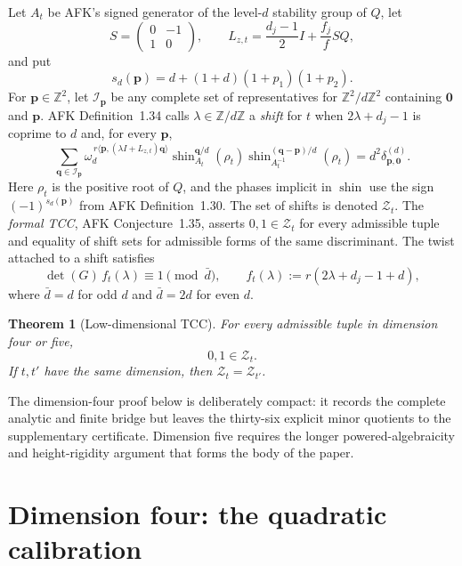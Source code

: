 \documentclass[11pt]{article}
\newtheorem{theorem}{Theorem}
\newcommand{\Z}{\mathbb Z}
\begin{document}
Let $A_t$ be AFK's signed generator of the level-$d$ stability group
of $Q$, let
\[
 S=\begin{pmatrix}0&-1\\1&0\end{pmatrix},\qquad
 L_{z,t}=\frac{d_j-1}{2}I+\frac{f_j}{f}SQ,
\]
and put
\[
 s_d(\boldsymbol p)
 =d+(1+d)(1+p_1)(1+p_2).
\]
For $\boldsymbol p\in\Z^2$, let
$\mathcal I_{\boldsymbol p}$ be any complete set of representatives
for $\Z^2/d\Z^2$ containing $\boldsymbol0$ and $\boldsymbol p$.
AFK Definition~1.34 calls $\lambda\in\Z/d\Z$ a \emph{shift} for $t$
when $2\lambda+d_j-1$ is coprime to $d$ and, for every
$\boldsymbol p$,
\[
 \sum_{\boldsymbol q\in\mathcal I_{\boldsymbol p}}
 \omega_d^{\,r\langle\boldsymbol p,
  (\lambda I+L_{z,t})\boldsymbol q\rangle}
 \operatorname{shin}_{A_t}^{\boldsymbol q/d}(\rho_t)
 \operatorname{shin}_{A_t^{-1}}^{
       (\boldsymbol q-\boldsymbol p)/d}(\rho_t)
 =d^2\delta_{\boldsymbol p,\boldsymbol0}^{(d)}.
\tag{TCC}
\]
Here $\rho_t$ is the positive root of $Q$, and the phases implicit in
$\operatorname{shin}$ use the sign $(-1)^{s_d(\boldsymbol p)}$ from
AFK Definition~1.30.  The set of shifts is denoted $\mathcal Z_t$.
The \emph{formal TCC}, AFK Conjecture~1.35, asserts
$0,1\in\mathcal Z_t$ for every admissible tuple and equality of shift
sets for admissible forms of the same discriminant.  The twist attached
to a shift satisfies
\[
 \det(G)\,f_t(\lambda)\equiv1\pmod{\bar d},\qquad
 f_t(\lambda):=r(2\lambda+d_j-1+d),
\]
where $\bar d=d$ for odd $d$ and $\bar d=2d$ for even $d$.

\begin{theorem}[Low-dimensional TCC]\label{thm:lowdim}
For every admissible tuple in dimension four or five,
\[
 0,1\in\mathcal Z_t.
\]
If $t,t'$ have the same dimension, then
$\mathcal Z_t=\mathcal Z_{t'}$.
\end{theorem}

The dimension-four proof below is deliberately compact: it records the
complete analytic and finite bridge but leaves the thirty-six explicit
minor quotients to the supplementary certificate.  Dimension five
requires the longer powered-algebraicity and height-rigidity argument
that forms the body of the paper.

\section{Dimension four: the quadratic calibration}\label{sec:d4}
\end{document}
